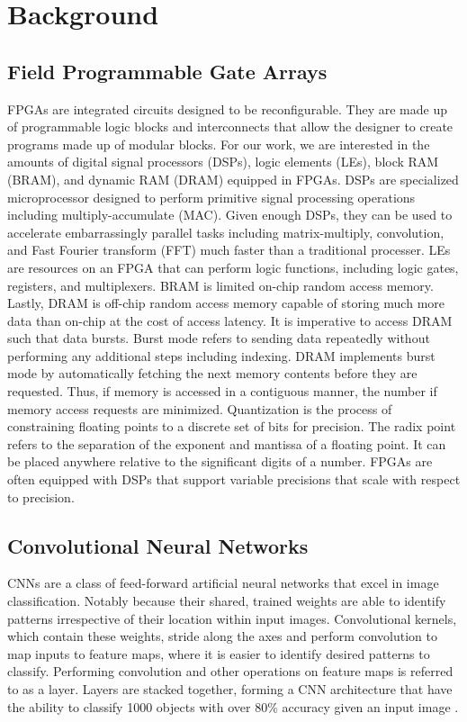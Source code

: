 \chapter{Background}
\section{Field Programmable Gate Arrays}
FPGAs are integrated circuits designed to be reconfigurable. They are made up of programmable logic blocks and interconnects that allow the designer to create programs made up of modular blocks. For our work, we are interested in the amounts of digital signal processors (DSPs), logic elements (LEs), block RAM (BRAM), and dynamic RAM (DRAM) equipped in FPGAs. DSPs are specialized microprocessor designed to perform primitive signal processing operations including multiply-accumulate (MAC). Given enough DSPs, they can be used to accelerate embarrassingly parallel tasks including matrix-multiply, convolution, and Fast Fourier transform (FFT) much faster than a traditional processer. LEs are resources on an FPGA that can perform logic functions, including logic gates, registers, and multiplexers. BRAM is limited on-chip random access memory. Lastly, DRAM is off-chip random access memory capable of storing much more data than on-chip at the cost of access latency. It is imperative to access DRAM such that data bursts. Burst mode refers to sending data repeatedly without performing any additional steps including indexing. DRAM implements burst mode by automatically fetching the next memory contents before they are requested. Thus, if memory is accessed in a contiguous manner, the number if memory access requests are minimized. Quantization is the process of constraining floating points to a discrete set of bits for precision. The radix point refers to the separation of the exponent and mantissa of a floating point. It can be placed anywhere relative to the significant digits of a number. FPGAs are often equipped with DSPs that support variable precisions that scale with respect to precision.

\section{Convolutional Neural Networks}
CNNs are a class of feed-forward artificial neural networks that excel in image classification. Notably because their shared, trained weights are able to identify patterns irrespective of their location within input images. Convolutional kernels, which contain these weights, stride along the axes and perform convolution to map inputs to feature maps, where it is easier to identify desired patterns to classify. Performing convolution and other operations on feature maps is referred to as a layer. Layers are stacked together, forming a CNN architecture that have the ability to classify 1000 objects with over 80\% accuracy given an input image \cite{krizhevsky2012imagenet}.

